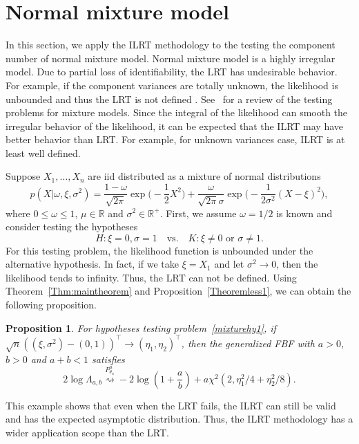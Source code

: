 \documentclass[11pt]{article}
\theoremstyle{plain}
\newtheorem{proposition}{\quad\quad Proposition}
\theoremstyle{definition}
\theoremstyle{remark}
\begin{document}
\section{Normal mixture model}
In this section, we apply the ILRT methodology to the testing the component number of normal mixture model.
Normal mixture model is a highly irregular model.
Due to partial loss of identifiability, the LRT has undesirable behavior.
For example, if the component variances are totally unknown, the likelihood is unbounded and thus the LRT is not defined \citep{Cam1990Maximum}.
See~\cite{chenjiahua2017} for a review of the testing problems for mixture models.
Since the integral of the likelihood can smooth the irregular behavior of the likelihood, it can be expected that the ILRT may have better behavior than LRT.
For example, for unknown variances case, ILRT is at least well defined.

Suppose $X_1,\ldots,X_n$ are iid distributed as a mixture of normal distributions
\begin{equation*}
    p(X|\omega,\xi,\sigma^2)=\frac{1-\omega}{\sqrt{2\pi}}\exp\big(-\frac{1}{2}X^2\big)
+\frac{\omega}{\sqrt{2\pi}\sigma}\exp\big(-\frac{1}{2\sigma^2}(X-\xi)^2\big),
\end{equation*}
where $0\leq \omega \leq 1$, $\mu\in \mathbb{R}$ and $\sigma^2\in \mathbb{R}^+$.
First, we assume $\omega=1/2$ is known and consider testing the hypotheses
\begin{equation}
    H: \xi=0,\sigma=1\quad \text{vs.} \quad K: \xi\neq 0 \text{ or } \sigma \neq 1.
    \label{mixturehy1}
\end{equation}
For this testing problem, the likelihood function is unbounded under the alternative hypothesis.
In fact, if we take $\xi=X_1$ and let $\sigma^2\to 0$, then the likelihood tends to infinity.
Thus, the LRT can not be defined.
Using Theorem~\ref{Thm:maintheorem} and Proposition~\ref{Theoremless1}, we can obtain the following proposition.
\begin{proposition}
For hypotheses testing problem~\eqref{mixturehy1}, 
if $\sqrt{n}((\xi,\sigma^2)-(0,1))^\top \to (\eta_1,\eta_2)^\top  $, 
then the generalized FBF with $a>0$, $b>0$ and $a+b<1$ satisfies
\begin{equation*}
    2\log \Lambda_{a,b}\overset{P^n_{\theta_n}}{\rightsquigarrow}-2\log (1+\frac{a}{b})+{a}\chi^2(2,\eta_1^2/4+\eta_2^2/8).
\end{equation*}
    \label{propositionTT}
\end{proposition}
This example shows that even when the LRT fails, the ILRT can still be valid and has the expected asymptotic distribution.
Thus, the ILRT methodology has a wider application scope than the LRT.
\end{document}
